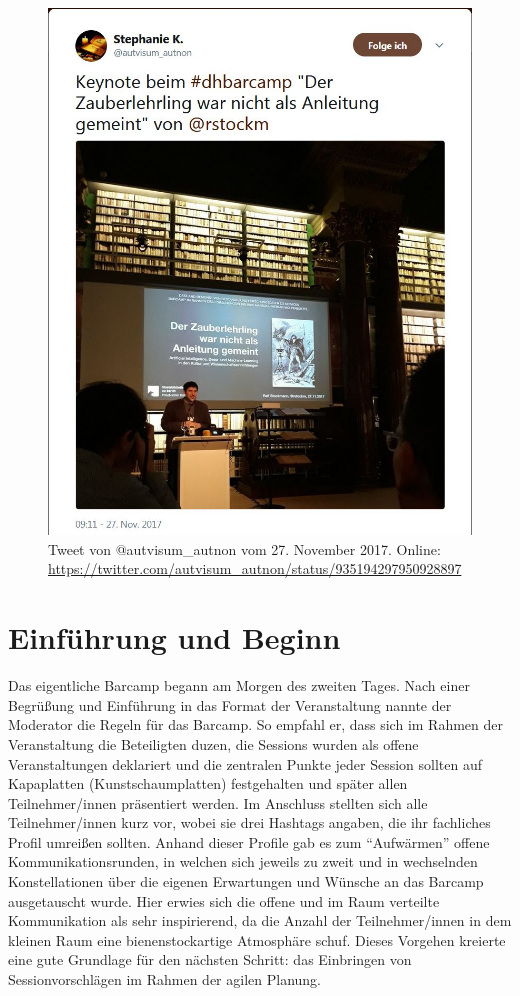 \documentclass[a4paper,
fontsize=11pt,
oneside,
numbers=noperiodatend,
parskip=half-,
bibliography=totoc,
final
]{scrartcl}
\begin{document}
\begin{figure}
\centering
\includegraphics{img/Abbildung3.jpg}
\caption{Tweet von @autvisum\_autnon vom 27. November 2017. Online:
\href{https://twitter.com/autvisum\_autnon/status/935194297950928897}{https://twitter.com/autvisum\_autnon/status/935194297950928897}}
\end{figure}

\section{Einführung und Beginn}\label{einfuerung-und-beginn}

Das eigentliche Barcamp begann am Morgen des zweiten Tages. Nach einer
Begrüßung und Einführung in das Format der Veranstaltung nannte der
Moderator die Regeln für das Barcamp. So empfahl er, dass sich im Rahmen
der Veranstaltung die Beteiligten duzen, die Sessions wurden als offene
Veranstaltungen deklariert und die zentralen Punkte jeder Session
sollten auf Kapaplatten (Kunstschaumplatten) festgehalten und später
allen Teilnehmer/innen präsentiert werden. Im Anschluss stellten sich
alle Teilnehmer/innen kurz vor, wobei sie drei Hashtags angaben, die ihr
fachliches Profil umreißen sollten. Anhand dieser Profile gab es zum
\enquote{Aufwärmen} offene Kommunikationsrunden, in welchen sich jeweils
zu zweit und in wechselnden Konstellationen über die eigenen Erwartungen
und Wünsche an das Barcamp ausgetauscht wurde. Hier erwies sich die
offene und im Raum verteilte Kommunikation als sehr inspirierend, da die
Anzahl der Teilnehmer/innen in dem kleinen Raum eine bienenstockartige
Atmosphäre schuf. Dieses Vorgehen kreierte eine gute Grundlage für den
nächsten Schritt: das Einbringen von Sessionvorschlägen im Rahmen der
agilen Planung.
\end{document}
